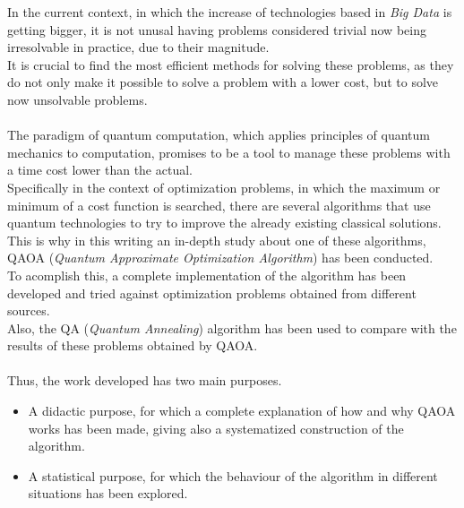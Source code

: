 In the current context, in which the increase of technologies based in \textit{Big Data} is getting bigger, it is not unusal having problems considered trivial now being irresolvable in practice, due to their magnitude.
\\
It is crucial to find the most efficient methods for solving these problems, as they do not only make it possible to solve a problem with a lower cost, but to solve now unsolvable problems.
\\\\
The paradigm of quantum computation, which applies principles of quantum mechanics to computation, promises to be a tool to manage these problems with a time cost lower than the actual.
\\
Specifically in the context of optimization problems, in which the maximum or minimum of a cost function is searched, there are several algorithms that use quantum technologies to try to improve the already existing classical solutions.
\\
This is why in this writing an in-depth study about one of these algorithms, QAOA (\textit{Quantum Approximate Optimization Algorithm}) has been conducted.
\\
To acomplish this, a complete implementation of the algorithm has been developed and tried against optimization problems obtained from different sources.
\\
Also, the QA (\textit{Quantum Annealing}) algorithm has been used to compare with the results of these problems obtained by QAOA\@.
\\\\
Thus, the work developed has two main purposes.
\begin{itemize}
\item A didactic purpose, for which a complete explanation of how and why QAOA works has been made, giving also a systematized construction of the algorithm.
  
\item A statistical purpose, for which the behaviour of the algorithm in different situations has been explored.
\end{itemize}


